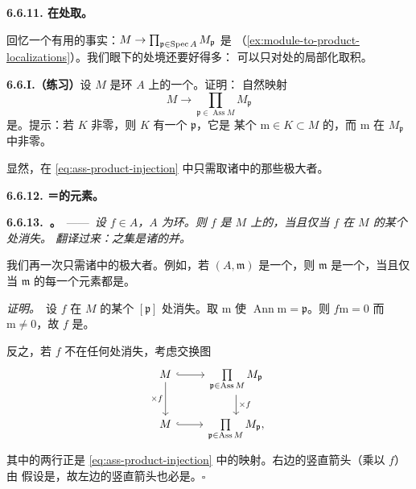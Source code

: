 \textbf{6.6.11. 在\trAssociatedPrimeIdeal{}处取\trLocalization。}

回忆一个有用的事实：$M\to\prod_{\mathfrak{p}\in\operatorname{Spec} A}M_{\mathfrak{p}}$ 是%
\trInjectiveMap{}（\cref{ex:module-to-product-localizations}）。我们眼下的处境还要好得多：
可以只对\emph{\trAssociatedPrimeIdeal{}}处的局部化取积。

\textbf{6.6.I.（练习）}\quad 设 $M$ 是\trNoetherian{}环 $A$ 上的一个\trModule。证明：
自然映射
\begin{equation*}\tag{6.6.11.1}\label{eq:ass-product-injection}
M\longrightarrow\prod_{\mathfrak{p}\in\operatorname{Ass}M}M_{\mathfrak{p}}
\end{equation*}
是\trInjectiveMap。提示：若\trKernel{} $K$ 非零，则 $K$ 有一个\trAssociatedPrimeIdeal{} $\mathfrak{p}$，它是
某个 $\mathrm{m}\in K\subset M$ 的\trAnnihilatorIdeal{}，而 $\mathrm{m}$ 在 $M_{\mathfrak{p}}$ 中非零。

显然，在 \eqref{eq:ass-product-injection} 中只需取诸\trAssociatedPrimeIdeal{}中的那些极大者。

\textbf{6.6.12. \trZerodivisor{}＝\trAssociatedPrimeIdeal{}的元素。}

\textbf{6.6.13.\ \trhProposition。}\ ——\ \emph{设 $f\in A$，$A$ 为\trNoetherian{}环。则
$f$ 是 $M$ 上的\trZerodivisor，当且仅当 $f$ 在 $M$ 的某个\trAssociatedPoint{}处消失。
翻译过来：\trZerodivisor{}之集是诸\trAssociatedPrimeIdeal{}的并。}

我们再一次只需诸\trAssociatedPrimeIdeal{}中的极大者。例如，若 $(A,\mathfrak{m})$ 是一个\trLocalRing，则
$\mathfrak{m}$ 是一个\trAssociatedPrimeIdeal{}，当且仅当 $\mathfrak{m}$ 的每一个元素都是\trZerodivisor。

\emph{证明。}\ 设 $f$ 在 $M$ 的某个\trAssociatedPoint{} $[\mathfrak{p}]$ 处消失。取
$\mathrm{m}$ 使 $\operatorname{Ann}\mathrm{m}=\mathfrak{p}$。则 $f\mathrm{m}=0$ 而
$\mathrm{m}\neq 0$，故 $f$ 是\trZerodivisor。

反之，若 $f$ 不在任何\trAssociatedPoint{}处消失，考虑交换图
\[
\begin{tikzcd}
M \ar[r,hook] \ar[d,"\times f"'] & \prod\limits_{\mathfrak{p}\in\operatorname{Ass}M}M_{\mathfrak{p}} \ar[d,"\times f"] \\
M \ar[r,hook] & \prod\limits_{\mathfrak{p}\in\operatorname{Ass}M}M_{\mathfrak{p}},
\end{tikzcd}
\]
其中的两行正是 \eqref{eq:ass-product-injection} 中的映射。右边的竖直箭头（乘以 $f$）由
假设是\trInjectiveMap，故左边的竖直箭头也必是\trInjectiveMap。\hfill$\square$

